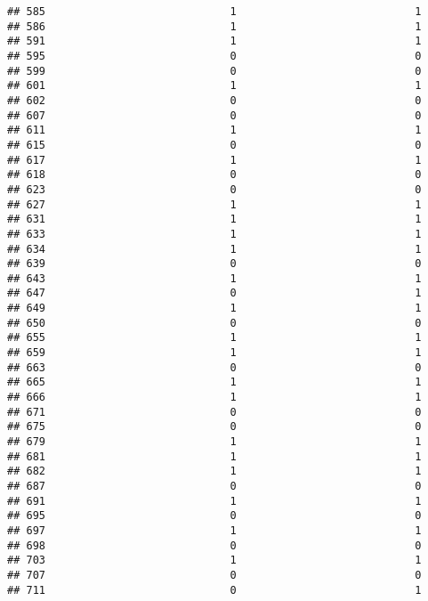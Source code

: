 \documentclass[
]{article}
\begin{document}
\begin{verbatim}
## 585                             1                            1
## 586                             1                            1
## 591                             1                            1
## 595                             0                            0
## 599                             0                            0
## 601                             1                            1
## 602                             0                            0
## 607                             0                            0
## 611                             1                            1
## 615                             0                            0
## 617                             1                            1
## 618                             0                            0
## 623                             0                            0
## 627                             1                            1
## 631                             1                            1
## 633                             1                            1
## 634                             1                            1
## 639                             0                            0
## 643                             1                            1
## 647                             0                            1
## 649                             1                            1
## 650                             0                            0
## 655                             1                            1
## 659                             1                            1
## 663                             0                            0
## 665                             1                            1
## 666                             1                            1
## 671                             0                            0
## 675                             0                            0
## 679                             1                            1
## 681                             1                            1
## 682                             1                            1
## 687                             0                            0
## 691                             1                            1
## 695                             0                            0
## 697                             1                            1
## 698                             0                            0
## 703                             1                            1
## 707                             0                            0
## 711                             0                            1

\end{verbatim}
\end{document}
